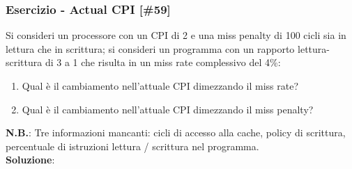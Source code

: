 \documentclass[12pt,a4paper]{article}
\begin{document}
\subsubsection{Esercizio - Actual CPI [\#59]}
Si consideri un processore con un CPI di 2 e una miss penalty di 100 cicli sia in lettura che in scrittura; si consideri un programma con un rapporto lettura-scrittura di 3 a 1 che risulta in un miss rate complessivo del 4\%:
\begin{enumerate}
\item Qual è il cambiamento nell'attuale CPI dimezzando il miss rate?
\item Qual è il cambiamento nell'attuale CPI dimezzando il miss penalty?
\end{enumerate}
\textbf{N.B.}: Tre informazioni mancanti: cicli di accesso alla cache, policy di scrittura, percentuale di istruzioni lettura / scrittura nel programma.\\
\textbf{Soluzione}:
\begin{center}
\end{center}
\end{document}
